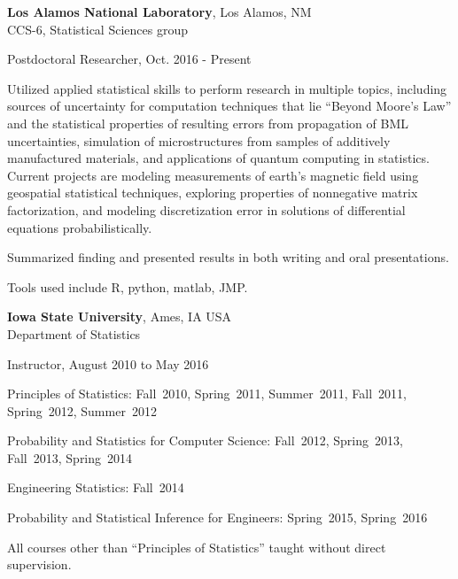 \documentclass[11pt]{article}
\newenvironment{outerlist}[1][\enskip\textbullet]%
        {\begin{itemize}[#1]}{\end{itemize}%
         \vspace{-.6\baselineskip}}
\newenvironment{innerlist}[1][\enskip\textbullet]%
        {\begin{compactitem}[#1]}{\end{compactitem}}
\begin{document}
\textbf{Los Alamos National Laboratory}, Los Alamos, NM\\
CCS-6, Statistical Sciences group 
	\begin{outerlist}
		 \item[] Postdoctoral Researcher, Oct. 2016 - Present
		 \begin{innerlist}
	\item Utilized applied statistical skills to perform research in multiple topics, including sources of uncertainty for computation techniques that lie ``Beyond Moore’s Law'' and the statistical properties of resulting errors from propagation of BML uncertainties, simulation of microstructures from samples of additively manufactured materials, and applications of quantum computing in statistics. Current projects are modeling measurements of earth's magnetic field using geospatial statistical techniques, exploring properties of nonnegative matrix factorization, and modeling discretization error in solutions of differential equations probabilistically.
	\item Summarized finding and presented results in both writing and oral presentations.
	\item Tools used include R, python, matlab, JMP.
		\end{innerlist}
	\end{outerlist}
\vspace{0.1in}

\textbf{Iowa State University}, Ames, IA USA\\
Department of Statistics 

\begin{outerlist}
\item[] Instructor, August 2010 to May 2016

      \begin{innerlist}
        \item Principles of Statistics: Fall~2010, Spring~2011, Summer~2011, Fall~2011, Spring~2012, Summer~2012
        \item Probability and Statistics for Computer Science: Fall~2012, Spring~2013, Fall~2013, Spring~2014
        \item Engineering Statistics: Fall~2014
        \item Probability and Statistical Inference for Engineers: Spring~2015, Spring~2016
        \item All courses other than ``Principles of Statistics'' taught without direct supervision.
       \end{innerlist}
\end{outerlist}
\end{document}
